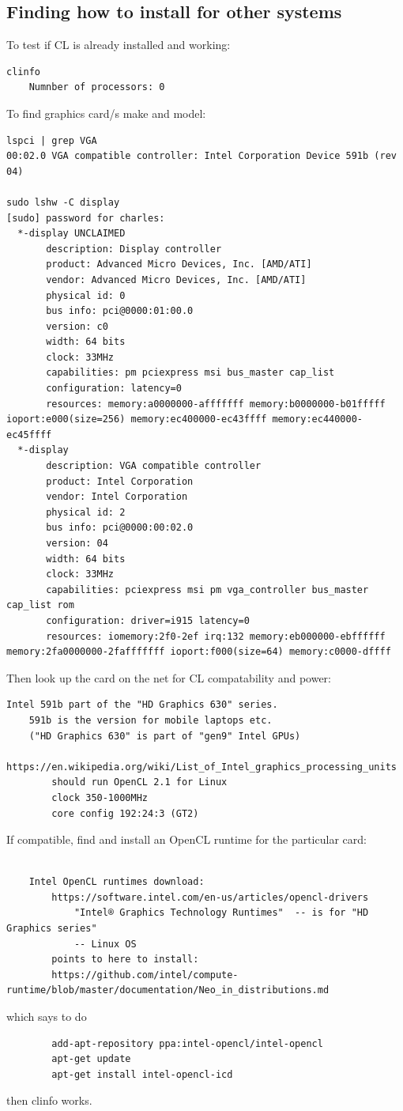 \documentclass[oneside,english]{scrbook}
\begin{document}
\subsection{Finding how to install for other systems}

To test if CL is already installed and working:

\begin{lstlisting}
clinfo
	Numnber of processors: 0
\end{lstlisting}

To find graphics card/s make and model:

\begin{lstlisting}
lspci | grep VGA
00:02.0 VGA compatible controller: Intel Corporation Device 591b (rev 04)

sudo lshw -C display
[sudo] password for charles: 
  *-display UNCLAIMED     
       description: Display controller
       product: Advanced Micro Devices, Inc. [AMD/ATI]
       vendor: Advanced Micro Devices, Inc. [AMD/ATI]
       physical id: 0
       bus info: pci@0000:01:00.0
       version: c0
       width: 64 bits
       clock: 33MHz
       capabilities: pm pciexpress msi bus_master cap_list
       configuration: latency=0
       resources: memory:a0000000-afffffff memory:b0000000-b01fffff ioport:e000(size=256) memory:ec400000-ec43ffff memory:ec440000-ec45ffff
  *-display
       description: VGA compatible controller
       product: Intel Corporation
       vendor: Intel Corporation
       physical id: 2
       bus info: pci@0000:00:02.0
       version: 04
       width: 64 bits
       clock: 33MHz
       capabilities: pciexpress msi pm vga_controller bus_master cap_list rom
       configuration: driver=i915 latency=0
       resources: iomemory:2f0-2ef irq:132 memory:eb000000-ebffffff memory:2fa0000000-2fafffffff ioport:f000(size=64) memory:c0000-dffff
\end{lstlisting}

Then look up the card on the net for CL compatability and power:

\begin{lstlisting}
Intel 591b part of the "HD Graphics 630" series. 
	591b is the version for mobile laptops etc.
	("HD Graphics 630" is part of "gen9" Intel GPUs)
	https://en.wikipedia.org/wiki/List_of_Intel_graphics_processing_units
		should run OpenCL 2.1 for Linux
		clock 350-1000MHz
		core config 192:24:3 (GT2)
\end{lstlisting}
If compatible, find and install an OpenCL runtime for the particular card:
\begin{lstlisting}

	Intel OpenCL runtimes download:
		https://software.intel.com/en-us/articles/opencl-drivers
			"Intel® Graphics Technology Runtimes"  -- is for "HD Graphics series"
			-- Linux OS
		points to here to install:
		https://github.com/intel/compute-runtime/blob/master/documentation/Neo_in_distributions.md

\end{lstlisting}
	which says to do
\begin{lstlisting}
		add-apt-repository ppa:intel-opencl/intel-opencl
		apt-get update
		apt-get install intel-opencl-icd
\end{lstlisting}
then clinfo works.
\end{document}
